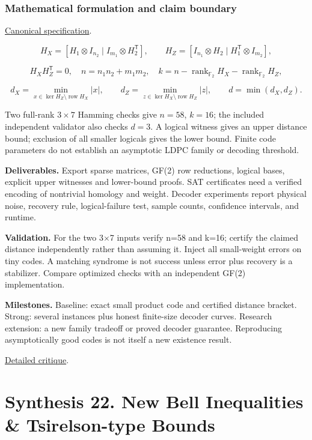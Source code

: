 \documentclass[
  11pt,
]{article}
\begin{document}
\subsubsection{Mathematical formulation and claim boundary}

\href{https://github.com/rick-stevens-ai/Pure-Thought/blob/main/PRDs/21-Quantum-LDPC-Codes.md}{Canonical
specification}.

\[H_X=[H_1\otimes I_{n_2}\mid I_{m_1}\otimes H_2^{\mathsf T}],
\qquad H_Z=[I_{n_1}\otimes H_2\mid H_1^{\mathsf T}\otimes I_{m_2}],\]

\[H_XH_Z^{\mathsf T}=0,\quad n=n_1n_2+m_1m_2,\quad
k=n-\operatorname{rank}_{\mathbb F_2}H_X-\operatorname{rank}_{\mathbb F_2}H_Z,\]

\[d_X=\min_{x\in\ker H_Z\setminus\operatorname{row}H_X}|x|,
\qquad d_Z=\min_{z\in\ker H_X\setminus\operatorname{row}H_Z}|z|,
\qquad d=\min(d_X,d_Z).\]

Two full-rank \(3\times7\) Hamming checks give \(n=58\), \(k=16\); the
included independent validator also checks \(d=3\). A logical witness
gives an upper distance bound; exclusion of all smaller logicals gives
the lower bound. Finite code parameters do not establish an asymptotic
LDPC family or decoding threshold.

\textbf{Deliverables.} Export sparse matrices, GF(2) row reductions,
logical bases, explicit upper witnesses and lower-bound proofs. SAT
certificates need a verified encoding of nontrivial homology and weight.
Decoder experiments report physical noise, recovery rule,
logical-failure test, sample counts, confidence intervals, and runtime.

\textbf{Validation.} For the two 3\ensuremath{\times}7 inputs verify
n=58 and k=16; certify the claimed distance independently rather than
assuming it. Inject all small-weight errors on tiny codes. A matching
syndrome is not success unless error plus recovery is a stabilizer.
Compare optimized checks with an independent GF(2) implementation.

\textbf{Milestones.} Baseline: exact small product code and certified
distance bracket. Strong: several instances plus honest finite-size
decoder curves. Research extension: a new family tradeoff or proved
decoder guarantee. Reproducing asymptotically good codes is not itself a
new existence result.

\href{https://github.com/rick-stevens-ai/Pure-Thought/blob/main/reviews/21-Quantum-LDPC-Codes.md}{Detailed
critique}.

\section{Synthesis 22. New Bell Inequalities \& Tsirelson-type Bounds}
\end{document}
